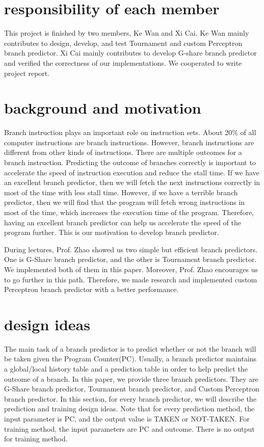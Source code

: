 \documentclass[conference]{IEEEtran}
\begin{document}
\section{responsibility of each member}
This project is finished by two members, Ke Wan and Xi Cai. Ke Wan mainly contributes to design, develop, and test Tournament 
and custom Perceptron branch predictor. Xi Cai mainly contributes to develop G-share branch predictor and verified the 
correctness of our implementations. We cooperated to write project report. 

\section{background and motivation}
Branch instruction plays an important role on instruction sets. About 20\% of all computer instructions are branch instructions. However, branch instructions are
different from other kinds of instructions. There are multiple outcomes for a branch instruction. Predicting the outcome of branches correctly is important to accelerate the speed of instruction execution and reduce the stall time. 
If we have an excellent branch predictor, then we will fetch the next instructions correctly in most of the time with less stall time. However, if we have a terrible branch predictor, then
we will find that the program will fetch wrong instructions in most of the time, which increases the execution time of the program. Therefore, having an excellent branch predictor can help us
accelerate the speed of the program further. This is our motivation to develop branch predictor. 

During lectures, Prof. Zhao showed us two simple but efficient branch predictors. One is G-Share branch predictor, and 
the other is Tournament branch predictor. We implemented both of them in this paper. Moreover, Prof. Zhao encourages us to go further in this path. Therefore, we made research and implemented custom 
Perceptron branch predictor with a better performance. 

\section{design ideas}
The main task of a branch predictor is to predict whether or not the branch will be taken given the Program Counter(PC). Usually, a branch predictor maintains a global/local history table and a prediction table
in order to help predict the outcome of a branch. In this paper, we provide three branch predictors. They are G-Share branch predictor, Tournament branch predictor, and Custom Perceptron branch predictor. 
In this section, for every branch predictor, we will describe the prediction and training design ideas. Note that for every prediction method, the input parameter is PC, and the output value is TAKEN or NOT-TAKEN. For 
training method, the input parameters are PC and outcome. There is no output for training method. 
\end{document}
